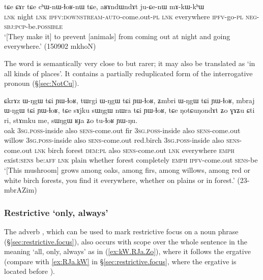 \begin{exe}
\ex \label{ex:aRAndWndAt.juCenW}
\gll tɕe ɕɤr tɕe cʰɯ-nɯ-ɬoʁ-nɯ tɕe, aʁɤndɯndɤt ju-ɕe-nɯ mɤ-kɯ-kʰɯ \\
\textsc{lnk} night \textsc{lnk} \textsc{ipfv}:\textsc{downstream}-\textsc{auto}-come.out-\textsc{pl} \textsc{lnk} everywhere \textsc{ipfv}-go-\textsc{pl} \textsc{neg}-\textsc{sbj}:\textsc{pcp}-be.\textsc{possible} \\
\glt `[They make it] to prevent [animals] from coming out at night and going everywhere.' (150902 mkhoN)
\end{exe} 

The word   is semantically very close to  but rarer; it may also be translated as `in all kinds of places'. It contains a partially reduplicated form of the interrogative pronoun  (§\ref{sec:NotCu}).

 \begin{exe}
\ex \label{ex:NotCuNondAt}
\gll ɕkrɤz ɯ-ŋgɯ tɕi ɲɯ-ɬoʁ, tɯrgi ɯ-ŋgɯ tɕi ɲɯ-ɬoʁ, ʑmbri ɯ-ŋgɯ tɕi ɲɯ-ɬoʁ,  mbraj ɯ-ŋgɯ tɕi ɲɯ-ɬoʁ, tɕe sɤjku sɯŋgɯ nɯra tɕi ɲɯ-ɬoʁ, tɕe ŋotɕuŋondɤt ʑo ɣɤʑu ɕti ri, stɤmku me, sɯŋgɯ ʁɟa ʑo tu-ɬoʁ ɲɯ-ŋu. \\
oak \textsc{3sg}.\textsc{poss}-inside also \textsc{sens}-come.out fir \textsc{3sg}.\textsc{poss}-inside also \textsc{sens}-come.out willow \textsc{3sg}.\textsc{poss}-inside also \textsc{sens}-come.out red.birch \textsc{3sg}.\textsc{poss}-inside also \textsc{sens}-come.out \textsc{lnk} birch  forest \textsc{dem}:\textsc{pl} also \textsc{sens}-come.out \textsc{lnk} everywhere \textsc{emph} exist:\textsc{sens} be:\textsc{aff}  \textsc{lnk} plain whether  forest completely \textsc{emph} \textsc{ipfv}-come.out \textsc{sens}-be \\
\glt `[This mushroom] grows among oaks, among firs, among willows, among red or white birch forests, you find it everywhere, whether on plains or in forest.' (23-mbrAZim) 
\end{exe} 


\subsubsection{Restrictive `only, always'} \label{sec:restrictive.adverbs}
 The adverb  , which can be used to mark restrictive focus on a noun phrase (§\ref{sec:restrictive.focus}), also occurs with scope over the whole sentence in the meaning `all, only, always' as in (\ref{ex:kW.RJa.Zo}), where it follows the ergative  (compare with \ref{ex:RJa.kW} in §\ref{sec:restrictive.focus}, where the ergative is located before ).

